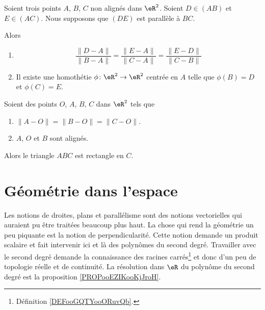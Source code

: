 \begin{theorem}     \label{THOooFMMLooLmAnAd}
	Soient trois points \( A\), \( B\), \( C\) non alignés dans \( \eR^2\). Soient \( D\in (AB)\) et \( E\in (AC)\). Nous supposons que \( (DE)\) est parallèle à \( BC\).

	Alors
	\begin{enumerate}
		\item
		      \begin{equation}
			      \frac{ \| D-A \| }{ \| B-A \| }=\frac{ \| E-A \| }{ \| C-A \| }=\frac{ \| E-D \| }{ \| C-B \| }
		      \end{equation}
		\item
		      Il existe une homothétie \( \phi\colon \eR^2\to \eR^2\) centrée en \( A\) telle que \( \phi(B)=D\) et \( \phi(C)=E\).
	\end{enumerate}
\end{theorem}

\begin{theorem}      \label{THOooGFTWooACQLFJ}
	Soient des points \( O\), \( A\), \( B\), \( C\) dans \( \eR^2\) tels que
	\begin{enumerate}
		\item
		      \( \| A-O \|=\| B-O \|=\| C-O \|\).
		\item
		      \( A\), \( O\) et \( B\) sont alignés.
	\end{enumerate}
	Alors le triangle \( ABC\) est rectangle en \( C\).
\end{theorem}


\section{Géométrie dans l'espace}

\begin{normaltext}
	Les notions de droites, plans et parallélisme sont des notions vectorielles qui auraient pu être traitées beaucoup plus haut. La chose qui rend la géométrie un peu piquante est la notion de perpendicularité. Cette notion demande un produit scalaire et fait intervenir ici et là des polynômes du second degré. Travailler avec le second degré demande la connaissance des racines carrés\footnote{Définition \ref{DEFooGQTYooORuvQb}.} et donc d'un peu de topologie réelle et de continuité. La résolution dans \( \eR\) du polynôme du second degré est la proposition \ref{PROPooEZIKooKjJroH}.
\end{normaltext}

